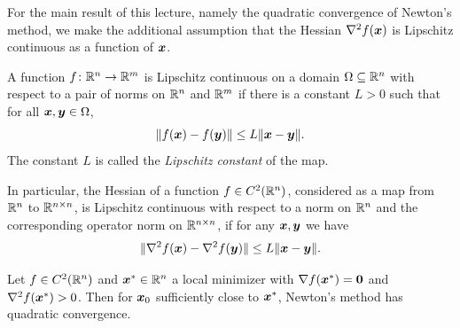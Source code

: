 For the main result of this lecture, namely the quadratic convergence of Newton's method, we make the additional assumption that the Hessian $\nabla^2f(\bm{x})$ is Lipschitz continuous as a function of $\bm{x}$.

\begin{definition}
 A function $f\colon \mathbb{R}^n\to \mathbb{R}^m$ is Lipschitz continuous on a domain $\Omega\subseteq \mathbb{R}^n$ with respect to a pair of norms on $\mathbb{R}^n$ and $\mathbb{R}^m$ if there is a constant $L>0$ such that for all $\bm{x},\bm{y}\in \Omega$,
 \begin{equation*}
  \Vert {f(\bm{x})-f(\bm{y})}\Vert\leq L\Vert {\bm{x}-\bm{y}}\Vert.
 \end{equation*}
 The constant $L$ is called the {\em Lipschitz constant} of the map.
\end{definition}

In particular, the Hessian of a function $f\in C^2(\mathbb{R}^n)$, considered as a map from $\mathbb{R}^n$ to $\mathbb{R}^{n\times n}$, is Lipschitz continuous with respect to a norm on $\mathbb{R}^n$ and the corresponding operator norm on $\mathbb{R}^{n\times n}$, 
if for any $\bm{x},\bm{y}$ we have
\begin{equation*}
 \Vert {\nabla^2f(\bm{x})-\nabla^2f(\bm{y})}\Vert\leq L \Vert {\bm{x}-\bm{y}}\Vert.
\end{equation*}

\begin{theorem}
 Let $f\in C^2(\mathbb{R}^n)$ and $\bm{x}^*\in \mathbb{R}^n$ a local minimizer with $\nabla f(\bm{x}^*)=\bm{0}$ and $\nabla^2f(\bm{x}^*)>0$. Then for $\bm{x}_0$ sufficiently close to $\bm{x}^*$, Newton's method has quadratic convergence.
\end{theorem}

